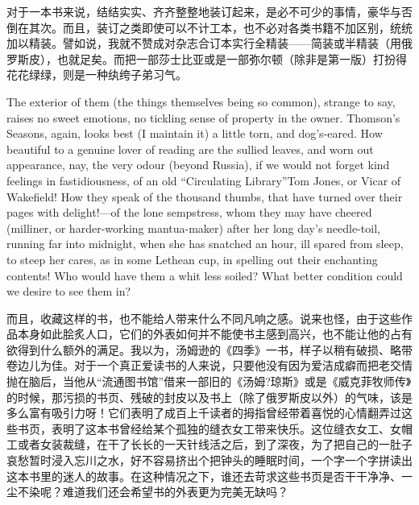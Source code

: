 {  对于一本书来说，结结实实、齐齐整整地装订起来，是必不可少的事情，豪华与否倒在其次。而且，装订之类即使可以不计工本，也不必对各类书籍不加区别，统统加以精装。譬如说，我就不赞成对杂志合订本实行全精装——简装或半精装（用俄罗斯皮），也就足矣。而把一部莎士比亚或是一部弥尔顿（除非是第一版）打扮得花花绿绿，则是一种纨绔子弟习气。

 The exterior of them (the things themselves being so common), strange to say, raises no sweet emotions, no tickling sense of property in the owner. Thomson's Seasons, again, looks best (I maintain it) a little torn, and dog's-eared. How beautiful to a genuine lover of reading are the sullied leaves, and worn out appearance, nay, the very odour (beyond Russia), if we would not forget kind feelings in fastidiousness, of an old “Circulating Library”Tom Jones, or Vicar of Wakefield! How they speak of the thousand thumbs, that have turned over their pages with delight!—of the lone sempstress, whom they may have cheered (milliner, or harder-working mantua-maker) after her long day's needle-toil, running far into midnight, when she has snatched an hour, ill spared from sleep, to steep her cares, as in some Lethean cup, in spelling out their enchanting contents! Who would have them a whit less soiled? What better condition could we desire to see them in? 
 
而且，收藏这样的书，也不能给人带来什么不同凡响之感。说来也怪，由于这些作品本身如此脍炙人口，它们的外表如何并不能使书主感到高兴，也不能让他的占有欲得到什么额外的满足。我以为，汤姆逊的《四季》一书，样子以稍有破损、略带卷边儿为佳。对于一个真正爱读书的人来说，只要他没有因为爱洁成癖而把老交情抛在脑后，当他从“流通图书馆”借来一部旧的《汤姆?琼斯》或是《威克菲牧师传》的时候，那污损的书页、残破的封皮以及书上（除了俄罗斯皮以外）的气味，该是多么富有吸引力呀！它们表明了成百上千读者的拇指曾经带着喜悦的心情翻弄过这些书页，表明了这本书曾经给某个孤独的缝衣女工带来快乐。这位缝衣女工、女帽工或者女装裁缝，在干了长长的一天针线活之后，到了深夜，为了把自己的一肚子哀愁暂时浸入忘川之水，好不容易挤出个把钟头的睡眠时间，一个字一个字拼读出这本书里的迷人的故事。在这种情况之下，谁还去苛求这些书页是否干干净净、一尘不染呢？难道我们还会希望书的外表更为完美无缺吗？


}
